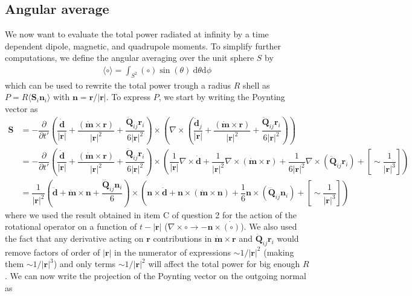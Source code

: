 \documentclass[10pt, a4paper]{article}
\begin{document}
{\subsection{Angular average}
We now want to evaluate the total power radiated at infinity by a time dependent dipole, magnetic, and quadrupole moments. To simplify further computations, we define the angular averaging over the unit sphere $S$ by
\begin{align*}
   \langle \circ \rangle = \int_{S^2} (\circ) \sin(\theta)\ \text{d} \theta \text{d} \phi
\end{align*}
which can be used to rewrite the total power trough a radius $R$ shell as $P = R\langle \mathbf{S}_i  \mathbf n_i\rangle$ with $\mathbf{n} = \mathbf{r}/|\mathbf{r}|$. To express $P$, we start by writing the Poynting vector as 
\begin{align*}
    \mathbf{S} &= - \dfrac{\partial}{\partial t'}\left(\dfrac{\dot{\mathbf{d}}}{|\mathbf{r}|} + \dfrac{(\dot{\mathbf{m}} \times \mathbf{r})}{|\mathbf{r}|^2} + \dfrac{\ddot{\mathbf{Q}}_{ij} \mathbf{r}_i}{6|\mathbf{r}|^2}\right) \times \left(\nabla \times \left(\dfrac{\dot{\mathbf{d}}_j}{|\mathbf{r}|} + \dfrac{(\dot{\mathbf{m}} \times \mathbf{r})}{|\mathbf{r}|^2} + \dfrac{\ddot{\mathbf{Q}}_{ij} \mathbf{r}_i}{6|\mathbf{r}|^2}\right)\right)\\
    &= -\dfrac{\partial}{\partial t'}\left(\dfrac{\dot{\mathbf{d}}}{|\mathbf{r}|} + \dfrac{(\dot{\mathbf{m}} \times \mathbf{r})}{|\mathbf{r}|^2} + \dfrac{\ddot{\mathbf{Q}}_{ij} \mathbf{r}_i}{6|\mathbf{r}|^2}\right) \times \left(\dfrac{1}{|\mathbf{r}|}\nabla \times \dot{\mathbf{d}} + \dfrac{1}{|\mathbf{r}|^2}  \nabla \times (\dot{\mathbf{m}} \times \mathbf{r}) + \dfrac{1}{6|\mathbf{r}|^2} \nabla \times (\ddot{\mathbf{Q}}_{ij} \mathbf{r}_i)+ \left[\sim \dfrac{1}{|\mathbf{r}|^3}\right]\right) \\
    &= \dfrac{1}{|\mathbf{r}|^2}\left(\ddot{\mathbf{d}} + \ddot{\mathbf{m}} \times \mathbf{n} + \dfrac{\dddot{\mathbf{Q}}_{ij} \mathbf{n}_i}{6}\right) \times \left(\mathbf{n} \times \ddot{\mathbf{d}} + \mathbf{n} \times (\ddot{\mathbf{m}} \times \mathbf{n}) + \dfrac{1}{6} \mathbf{n} \times (\dddot{\mathbf{Q}}_{ij} \mathbf{n}_i)+ \left[\sim \dfrac{1}{|\mathbf{r}|^3}\right]\right)
\end{align*} 
where we used the result obtained in item C of question 2 for the action of the rotational operator on a function of $t-|\mathbf{r}|$ ($\nabla \times \circ \to -\mathbf{n} \times \dot{(\circ)} $). We also used the fact that any derivative acting on $\mathbf{r}$ contributions in $\dot{\mathbf{m}} \times \mathbf{r}$ and $\ddot{\mathbf{Q}}_{ij} \mathbf{r}_i$ would remove factors of order of $|\mathbf{r}|$ in the numerator of expressions $\sim 1/|\mathbf{r}|^2$ (making them  $\sim 1/|\mathbf{r}|^3$) and only terms $\sim 1/|\mathbf{r}|^2$ will affect the total power for big enough $R$. We can now write the projection of the Poynting vector on the outgoing normal as 
}
\end{document}
